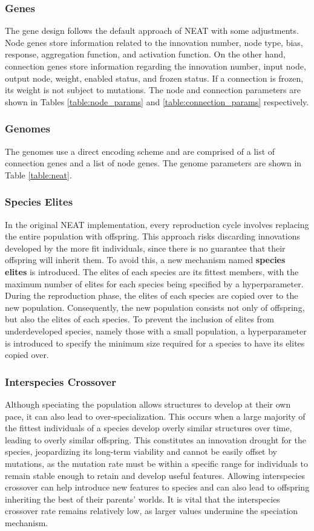 \documentclass[letterpaper, 12pt]{article}
\begin{document}
\subsubsection{Genes}
The gene design follows the default approach of NEAT with some adjustments. Node genes
store information related to the innovation number, node type, bias, response,
aggregation function, and activation function. On the other hand, connection genes store
information regarding the innovation number, input node, output node, weight, enabled
status, and frozen status. If a connection is frozen, its weight is not subject to
mutations. The node and connection parameters are shown in Tables
\ref{table:node_params} and \ref{table:connection_params} respectively.

\subsubsection{Genomes}
The genomes use a direct encoding scheme and are comprised of a list of connection
genes and a list of node genes. The genome parameters are shown in Table
\ref{table:neat}.

\subsubsection{Species Elites}
In the original NEAT implementation, every reproduction cycle involves replacing the
entire population with offspring. This approach risks discarding innovations developed
by the more fit individuals, since there is no guarantee that their offspring will
inherit them. To avoid this, a new mechanism named \textbf{species elites} is
introduced. The elites of each species are its fittest members, with the maximum number
of elites for each species being specified by a hyperparameter. During the reproduction
phase, the elites of each species are copied over to the new population. Consequently,
the new population consists not only of offspring, but also the elites of each species.
To prevent the inclusion of elites from underdeveloped species, namely those with a
small population, a hyperparameter is introduced to specify the minimum size required
for a species to have its elites copied over.

\subsubsection{Interspecies Crossover}
Although speciating the population allows structures to develop at their own pace, it
can also lead to over-specialization. This occurs when a large majority of the fittest
individuals of a species develop overly similar structures over time, leading to overly
similar offspring. This constitutes an innovation drought for the species, jeopardizing
its long-term viability and cannot be easily offset by mutations, as the mutation rate
must be within a specific range for individuals to remain stable enough to retain and
develop useful features. Allowing interspecies crossover can help introduce new features
to species and can also lead to offspring inheriting the best of their parents' worlds.
It is vital that the interspecies crossover rate remains relatively low, as larger
values undermine the speciation mechanism.
\end{document}
